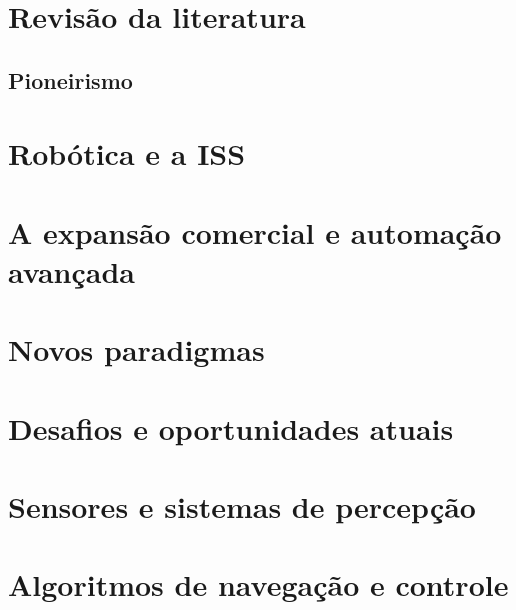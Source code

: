 \section{Revisão da literatura}

\subsection{Pioneirismo}



% 

\section{Robótica e a ISS}


\section{A expansão comercial e automação avançada}


\section{Novos paradigmas}


\section{Desafios e oportunidades atuais}


\section{Sensores e sistemas de percepção}








\section{Algoritmos de navegação e controle}


